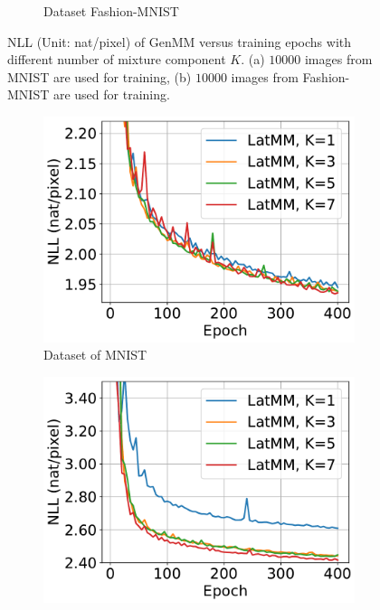 \begin{figure}[!t]
\begin{subfigure}{.4\textwidth}
    \caption{Dataset Fashion-MNIST}
    \label{fig-genmm-fsh-nll-curve}
  \end{subfigure}
  \caption{NLL (Unit: nat/pixel) of GenMM versus training epochs with different number of mixture component $K$. (a) $10000$ images from MNIST are used for training, (b) $10000$ images from Fashion-MNIST are used for training.}
  \label{fig:genmm-nll}
\end{figure}

\begin{figure}[!tp]
  \captionsetup[subfigure]{justification=centering}
  \centering
  \begin{subfigure}{.4\textwidth}
    \centering
    \includegraphics[width=1\linewidth]{images/supply/mnist_LatMM_nll_curves-crop.pdf}
    
    \caption{Dataset of MNIST}
    \label{fig-latmm-mnist-nll-curve}
  \end{subfigure}\hspace{1cm}
  \begin{subfigure}{.4\textwidth}
    \centering
    \includegraphics[width=1\linewidth]{images/supply/fashion_LatMM_nll_curves-crop.pdf}
    

\end{subfigure}
\end{figure}
